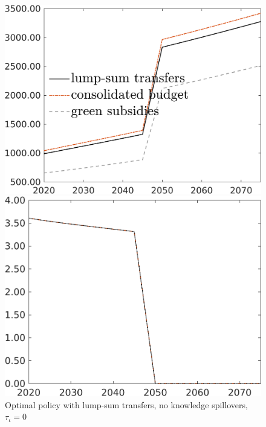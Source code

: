 \begin{figure}[h!!!]
	\centering
	\caption{Optimal policy with lump-sum transfers, no knowledge spillovers, $\tau_\iota=0$
	}\label{fig:opt_TLs_noknow}
	\begin{minipage}[]{0.32\textwidth}
		\includegraphics[width=1\textwidth]{../../codding_model/own_basedOnFried/optimalPol_010922_revision/figures/all_13Sept22/CompRed_Taul0_Tauf_spillover0_knspil0_nsk0_xgr0_sep0_LFlimit1_emsbase0_countec0_GovRev0_etaa0.79_lgd1.png}
	\end{minipage}
\begin{minipage}[]{0.32\textwidth}
\includegraphics[width=1\textwidth]{../../codding_model/own_basedOnFried/optimalPol_010922_revision/figures/all_13Sept22/CompRed_Taul0_Emnet_spillover0_knspil0_nsk0_xgr0_sep0_LFlimit1_emsbase0_countec0_GovRev0_etaa0.79_lgd0.png}

\end{minipage}
\end{figure}
